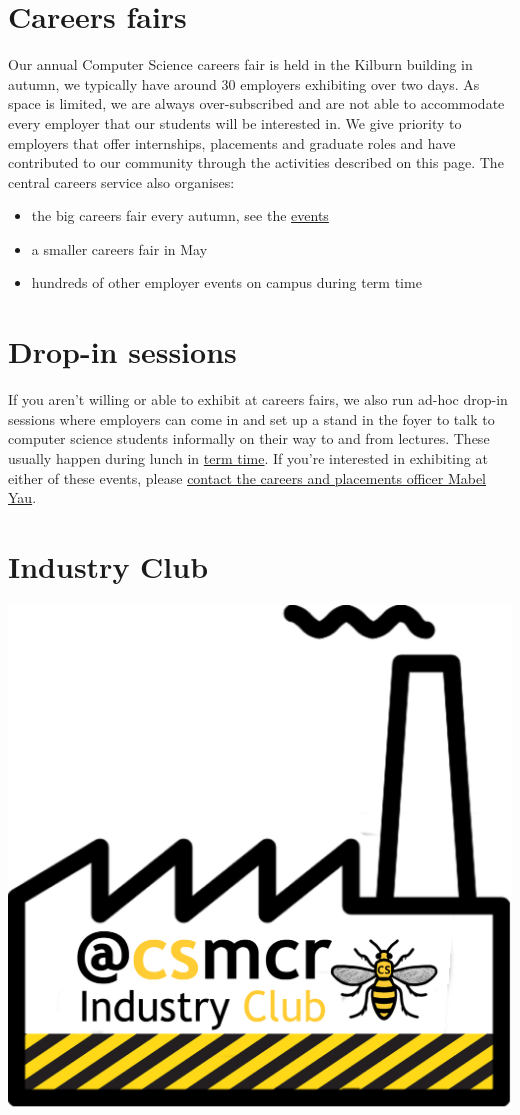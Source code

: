 \documentclass[
  12pt,
]{book}
\providecommand{\tightlist}{%
  \setlength{\itemsep}{0pt}\setlength{\parskip}{0pt}}
\begin{document}
\hypertarget{careersfairs}{%
\section{Careers fairs}\label{careersfairs}}

Our annual Computer Science careers fair is held in the Kilburn building in autumn, we typically have around 30 employers exhibiting over two days. As space is limited, we are always over-subscribed and are not able to accommodate every employer that our students will be interested in. We give priority to employers that offer internships, placements and graduate roles and have contributed to our community through the activities described on this page. The central careers service also organises:

\begin{itemize}
\tightlist
\item
  the big careers fair every autumn, see the \href{https://www.careers.manchester.ac.uk/events/}{events}
\item
  a smaller careers fair in May
\item
  hundreds of other employer events on campus during term time \citep{highfliers2020}
\end{itemize}

\hypertarget{dropins}{%
\section{Drop-in sessions}\label{dropins}}

If you aren't willing or able to exhibit at careers fairs, we also run ad-hoc drop-in sessions where employers can come in and set up a stand in the foyer to talk to computer science students informally on their way to and from lectures. These usually happen during lunch in \href{https://www.manchester.ac.uk/discover/key-dates/}{term time}. If you're interested in exhibiting at either of these events, please \protect\hyperlink{office}{contact the careers and placements officer Mabel Yau}.

\hypertarget{industryclub}{%
\section{Industry Club}\label{industryclub}}

\begin{center}\includegraphics[width=0.4\linewidth]{images/industry-club-black} \end{center}
\end{document}
